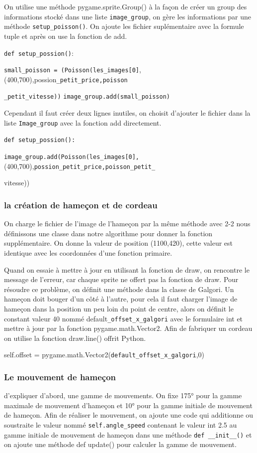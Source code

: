 \documentclass{article}
\begin{document}
On utilise une méthode pygame.sprite.Group() à la façon de créer un group des informations stocké dans une liste \verb|image_group|, on gère les informations par une méthode \verb|setup_poisson()|. On ajoute les fichier suplémentaire avec la formule tuple et après on use la fonction de add.\newline

\verb|def setup_possion()|:


\verb|small_poisson = (Poisson(les_images[0]|,(400,700),possion\verb|_petit_price,poisson|


\verb|_petit_vitesse))|
   \verb|image_group.add(small_poisson)|\newline

Cependant il faut créer deux lignes inutiles, on choisit d’ajouter le fichier dans la liste \verb|Image_group| avec la fonction add directement.
 
 
 \verb|def setup_possion():|

\verb|image_group.add(Poisson(les_images[0],| (400,700),\verb|possion_petit_price,poisson_petit_|

vitesse))
\subsubsection{la création de hameçon et de cordeau}
On charge le fichier de l’image de l’hameçon par la même méthode avec 2-2 nous définissons une classe dans notre algorithme pour donner la fonction supplémentaire. On donne la valeur de position (1100,420), cette valeur est identique avec les coordonnées d'une fonction primaire. 


Quand on essaie à mettre à jour en utilisant la fonction de draw, on rencontre le message de l’erreur, car chaque sprite ne offert pas la fonction de draw. Pour résoudre ce problème, on définit une méthode dans la classe de Galgori. Un hameçon doit bouger d'un côté à l’autre, pour cela il faut charger l’image de hameçon dans la position un peu loin du point de centre, alors on définit le constant valeur 40 nommé default\verb|_offset_x_galgori| avec le formulaire int et mettre à jour par la fonction pygame.math.Vector2. Afin de fabriquer un cordeau on utilise la fonction draw.line() offrit Python.\newline

 self.offset = pygame.math.Vector2(\verb|default_offset_x_galgori|,0)
\subsubsection{ Le mouvement de hameçon}
d’expliquer d’abord, une gamme de mouvements. On fixe 175° pour la gamme maximale de mouvement d’hameçon et 10° pour la gamme initiale de mouvement de hameçon. Afin de réaliser le mouvement, on ajoute une code qui additionne ou soustraite le valeur nommé \verb|self.angle_speed| contenant le valeur int 2.5 au gamme initiale de mouvement de hameçon dans une méthode \verb|def __init__()| et on ajoute une méthode def update() pour calculer la gamme de mouvement.\newline
\end{document}
